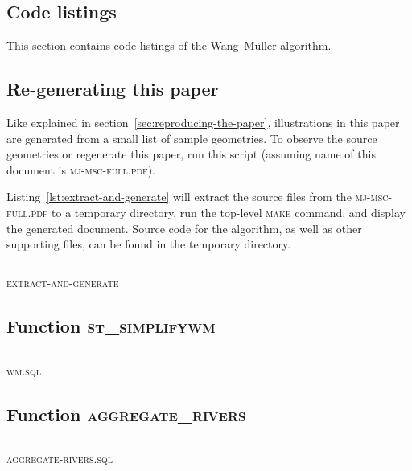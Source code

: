 \documentclass[a4paper]{article}
\newcommand{\WM}{Wang--M{\"u}ller}
\newcommand{\inputcode}[2]{\inputminted[fontsize=\small]{#1}{#2}}
\newenvironment{longlisting}{\captionsetup{type=listing}}{}
\begin{document}
\begin{appendices}

\section{Code listings}

This section contains code listings of the {\WM} algorithm.

\subsection{Re-generating this paper}
\label{sec:code-regenerate}

Like explained in section~\ref{sec:reproducing-the-paper}, illustrations in
    this paper are generated from a small list of sample geometries. To observe
    the source geometries or regenerate this paper, run this script (assuming
    name of this document is \textsc{mj-msc-full.pdf}).

    Listing~\ref{lst:extract-and-generate} will extract the source files from
    the \textsc{mj-msc-full.pdf} to a temporary directory, run the top-level
    \textsc{make} command, and display the generated document. Source code for
    the algorithm, as well as other supporting files, can be found in the
    temporary directory.

\begin{longlisting}
    \inputcode{bash}{extract-and-generate}
    \caption{\textsc{extract-and-generate}}
    \label{lst:extract-and-generate}
\end{longlisting}

\subsection{Function \textsc{st\_simplifywm}}
\begin{longlisting}
    \inputcode{postgresql}{wm.sql}
    \caption{\textsc{wm.sql}}
    \label{lst:wm.sql}
\end{longlisting}

\subsection{Function \textsc{aggregate\_rivers}}
\begin{longlisting}
    \inputcode{postgresql}{aggregate-rivers.sql}
    \caption{\textsc{aggregate-rivers.sql}}
    \label{lst:aggregate-rivers.sql}
\end{longlisting}

\end{appendices}
\end{document}
